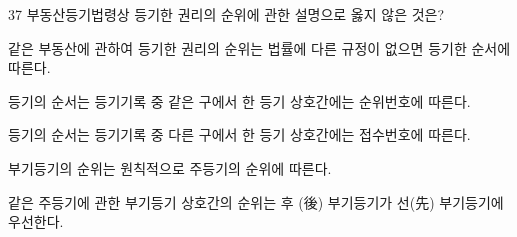 \begin{question}{37}
부동산등기법령상 등기한 권리의 순위에 관한 설명으로 옳지 않은 것은?
\begin{choices}
  \item 같은 부동산에 관하여 등기한 권리의 순위는 법률에 다른 규정이 없으면 등기한 순서에 따른다.
  \item 등기의 순서는 등기기록 중 같은 구에서 한 등기 상호간에는 순위번호에 따른다.
  \item 등기의 순서는 등기기록 중 다른 구에서 한 등기 상호간에는 접수번호에 따른다.
  \item 부기등기의 순위는 원칙적으로 주등기의 순위에 따른다.
  \item 같은 주등기에 관한 부기등기 상호간의 순위는 후 (後) 부기등기가 선(先) 부기등기에 우선한다.
\end{choices}
\end{question}
